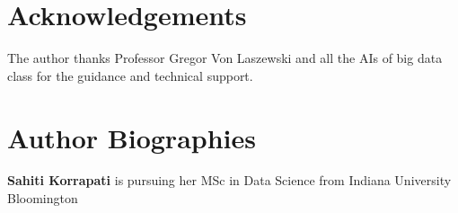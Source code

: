 \documentclass[9pt,twocolumn,twoside]{styles/osajnl}
\begin{document}
\section*{Acknowledgements}

The author thanks Professor Gregor Von Laszewski and all the AIs of big data class for the guidance and technical support.



 
\section*{Author Biographies}
\begingroup
\setlength\intextsep{0pt}
\begin{minipage}[t][3.2cm][t]{1.0\columnwidth} %
  \noindent
  {\bfseries Sahiti Korrapati} is pursuing her MSc in Data Science from
  Indiana University Bloomington
\end{minipage}
\endgroup
\end{document}
